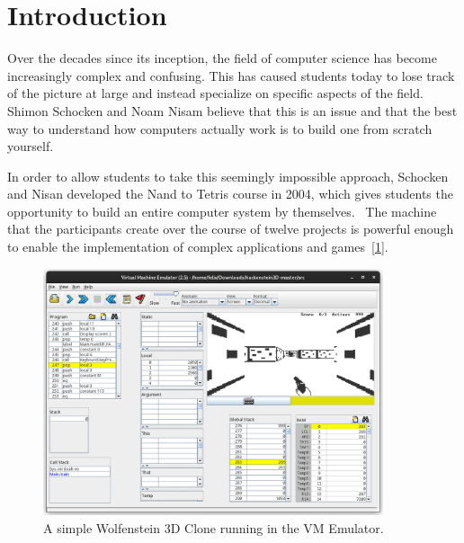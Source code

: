 \section{Introduction}
Over the decades since its inception, the field of computer science has become increasingly complex and confusing.
This has caused students today to lose track of the picture at large and instead specialize on specific aspects of the field.
Shimon Schocken and Noam Nisam believe that this is an issue and that the best way to understand how computers actually work is to build one from scratch yourself.~\cite[Preface]{nisan2005}

In order to allow students to take this seemingly impossible approach, Schocken and Nisan developed the Nand to Tetris course in 2004, which gives students the opportunity to build an entire computer system by themselves.~\cite{1408798}
The machine that the participants create over the course of twelve projects is powerful enough to enable the implementation of complex applications and games~[\ref{fig:hackenstein-official}].

\begin{center}
  \begin{figure}[ht]
    \centering
    \includegraphics[width=10cm]{fig/hackenstein-official.png}
    \caption{A simple Wolfenstein 3D Clone running in the VM Emulator.}%
    \label{fig:hackenstein-official}
  \end{figure}
\end{center}

